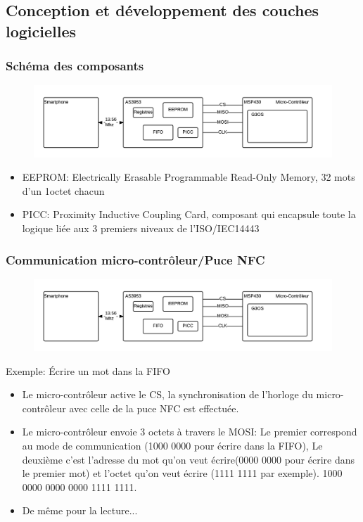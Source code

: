 \documentclass{beamer}
\begin{document}
\subsection{Conception et développement des couches logicielles}
\begin{frame}
\frametitle{Schéma des composants}
\begin{figure}
\centering
\includegraphics[scale=0.5]{images/block-diagram.png}
\end{figure}
\begin{itemize}
\item EEPROM: Electrically Erasable Programmable Read-Only Memory, 32 mots d'un 1octet chacun
\item PICC: Proximity Inductive Coupling Card, composant qui encapsule toute la logique liée aux 3 premiers niveaux de l'ISO/IEC14443 
\end{itemize}

\end{frame}
\begin{frame}
\frametitle{Communication micro-contrôleur/Puce NFC}
\begin{figure}
\centering
\includegraphics[scale=0.5]{images/block-diagram.png}
\end{figure}
Exemple: Écrire un mot dans la FIFO
\begin{itemize}
\item Le micro-contrôleur active le CS, la synchronisation de l'horloge du micro-contrôleur avec celle de la puce NFC est effectuée.
\item Le micro-contrôleur envoie 3 octets à travers le MOSI: Le premier correspond au mode de communication (1000 0000 pour écrire dans la FIFO), Le deuxième c'est l'adresse du mot qu'on veut écrire(0000 0000 pour écrire dans le premier mot) et l'octet qu'on veut écrire (1111 1111 par exemple). 1000 0000 0000 0000 1111 1111.
\item De même pour la lecture...

\end{itemize}

\end{frame}
\end{document}
